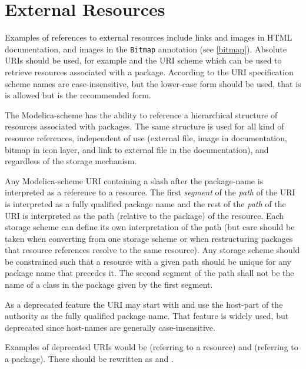 \section{External Resources}\label{external-resources}

Examples of references to external resources include links and images in HTML documentation, and images in the \lstinline!Bitmap! annotation (see \cref{bitmap}).
Absolute URIs should be used, for example  and the URI scheme  which can be used to retrieve resources associated with a package.
According to the URI specification scheme names are case-insensitive, but the lower-case form should be used, that is  is allowed but  is the recommended form.

The Modelica-scheme has the ability to reference a hierarchical structure of resources associated with packages.
The same structure is used for all kind of resource references, independent of use (external file, image in documentation, bitmap in icon layer, and link to external file in the documentation), and regardless of the storage mechanism.

Any Modelica-scheme URI containing a slash after the package-name is interpreted as a reference to a resource.
The first \emph{segment} of the \emph{path} of the URI is interpreted as a fully qualified package name and the rest of the \emph{path} of the URI is interpreted as the path (relative to the package) of the resource.
Each storage scheme can define its own interpretation of the path (but care should be taken when converting from one storage scheme or when restructuring packages that resource references resolve to the same resource).
Any storage scheme should be constrained such that a resource with a given path should be unique for any package name that precedes it.
The second segment of the path shall not be the name of a class in the package given by the first segment.

As a deprecated feature the URI may start with  and use the host-part of the authority as the fully qualified package name.
That feature is widely used, but deprecated since host-names are generally case-insensitive.
\begin{nonnormative}
Examples of deprecated URIs would be  (referring to a resource) and  (referring to a package).
These should be rewritten as  and .
\end{nonnormative}


